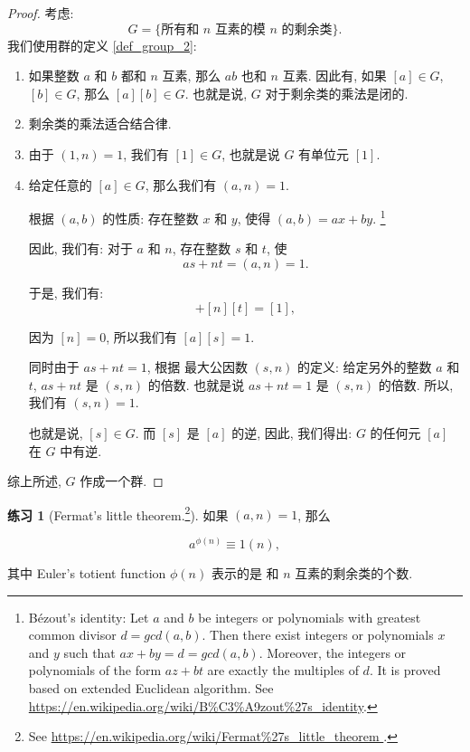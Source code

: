 \documentclass[utf8]{ctexbook}
\theoremstyle{definition}
\newtheorem{exercise}{练习}[section]
\begin{document}
\begin{proof}
考虑:
\begin{equation}
G = \{ \mbox{所有和 $n$ 互素的模 $n$ 的剩余类} \} .
\end{equation}
我们使用群的定义 \ref{def_group_2}:

\begin{enumerate}
\item{如果整数 $a$ 和 $b$ 都和 $n$ 互素, 那么 $ab$ 也和 $n$ 互素. 因此有, 如果 $[a] \in G$, $[b] \in G$, 那么 $[a][b] \in G$. 也就是说, $G$ 对于剩余类的乘法是闭的.}
\item{剩余类的乘法适合结合律.}
\item{由于 $(1, n ) = 1$, 我们有 $[1] \in G$, 也就是说 $G$ 有单位元 $[1]$.}
\item{给定任意的 $[a] \in G$, 那么我们有 $(a, n) = 1$. 

根据 $(a,b)$ 的性质: 存在整数 $x$ 和 $y$, 使得 $(a, b) = ax + by$. \footnote{\label{footnote_bezout_identity} Bézout's identity: Let $a$ and $b$ be integers or polynomials with greatest common divisor $d= gcd(a,b)$. Then there exist integers or polynomials $x$ and $y$ such that $ax + by = d = gcd(a,b)$. Moreover, the integers or polynomials of the form $az + bt$ are exactly the multiples of $d$. It is proved based on extended Euclidean algorithm. See \url{https://en.wikipedia.org/wiki/B\%C3\%A9zout\%27s\_identity}.}

因此, 我们有: 对于 $a$ 和 $n$, 存在整数 $s$ 和 $t$, 使
\begin{equation}
as + nt = (a, n) = 1 .
\end{equation}

于是, 我们有:
\begin{equation}
[a] [s] + [n][t] = [1] ,
\end{equation}

因为 $[n]=0$, 所以我们有 $[a][s] = 1$. 

同时由于 $as + nt = 1 $, 根据 最大公因数 $(s,n)$ 的定义: 给定另外的整数 $a$ 和 $t$, $as + nt$ 是 $(s,n)$ 的倍数. 也就是说 $as + nt = 1$ 是 $(s,n)$ 的倍数. 所以, 我们有 $(s, n) = 1$. 

也就是说, $[s] \in G$. 而 $[s]$ 是 $[a]$ 的逆, 因此, 我们得出: $G$ 的任何元 $[a]$ 在 $G$ 中有逆.
}
\end{enumerate}

综上所述, $G$ 作成一个群.
\end{proof}

\begin{exercise}[Fermat's little theorem.\footnote{See \url{https://en.wikipedia.org/wiki/Fermat\%27s\_little\_theorem }.}]
如果 $(a,n)=1$, 那么

\begin{equation}
a^{\phi(n)} \equiv 1 (n) ,
\end{equation}

其中 Euler's totient function $ \phi (n) $ 表示的是 和 $n$ 互素的剩余类的个数.

\end{exercise}
\end{document}
